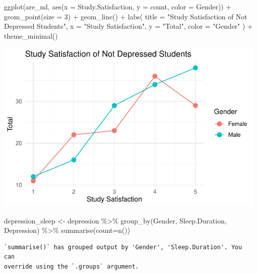 \documentclass[
  letterpaper,
  DIV=11,
  numbers=noendperiod]{scrartcl}
\newenvironment{Shaded}{\begin{snugshade}}{\end{snugshade}}
\newcommand{\AttributeTok}[1]{\textcolor[rgb]{0.40,0.45,0.13}{#1}}
\newcommand{\DecValTok}[1]{\textcolor[rgb]{0.68,0.00,0.00}{#1}}
\newcommand{\FunctionTok}[1]{\textcolor[rgb]{0.28,0.35,0.67}{#1}}
\newcommand{\NormalTok}[1]{\textcolor[rgb]{0.00,0.23,0.31}{#1}}
\newcommand{\OtherTok}[1]{\textcolor[rgb]{0.00,0.23,0.31}{#1}}
\newcommand{\SpecialCharTok}[1]{\textcolor[rgb]{0.37,0.37,0.37}{#1}}
\newcommand{\StringTok}[1]{\textcolor[rgb]{0.13,0.47,0.30}{#1}}
\begin{document}
\begin{Shaded}
\begin{Highlighting}[]
\FunctionTok{ggplot}\NormalTok{(are\_nd, }\FunctionTok{aes}\NormalTok{(}\AttributeTok{x =}\NormalTok{ Study.Satisfaction, }\AttributeTok{y =}\NormalTok{ count, }\AttributeTok{color =}\NormalTok{ Gender)) }\SpecialCharTok{+}
  \FunctionTok{geom\_point}\NormalTok{(}\AttributeTok{size =} \DecValTok{3}\NormalTok{) }\SpecialCharTok{+}    
  \FunctionTok{geom\_line}\NormalTok{() }\SpecialCharTok{+}       
  \FunctionTok{labs}\NormalTok{(}
    \AttributeTok{title =} \StringTok{"Study Satisfaction of Not Depressed Students"}\NormalTok{,}
    \AttributeTok{x =} \StringTok{"Study Satisfaction"}\NormalTok{,}
    \AttributeTok{y =} \StringTok{"Total"}\NormalTok{,}
    \AttributeTok{color =} \StringTok{"Gender"}
\NormalTok{  ) }\SpecialCharTok{+}
  \FunctionTok{theme\_minimal}\NormalTok{() }
\end{Highlighting}
\end{Shaded}

\includegraphics{Data_files/figure-pdf/unnamed-chunk-5-2.pdf}

\begin{Shaded}
\begin{Highlighting}[]
\NormalTok{depression\_sleep }\OtherTok{\textless{}{-}}\NormalTok{ depression }\SpecialCharTok{\%\textgreater{}\%} \FunctionTok{group\_by}\NormalTok{(Gender, Sleep.Duration, Depression) }\SpecialCharTok{\%\textgreater{}\%} \FunctionTok{summarise}\NormalTok{(}\AttributeTok{count=}\FunctionTok{n}\NormalTok{())}
\end{Highlighting}
\end{Shaded}

\begin{verbatim}
`summarise()` has grouped output by 'Gender', 'Sleep.Duration'. You can
override using the `.groups` argument.
\end{verbatim}
\end{document}
